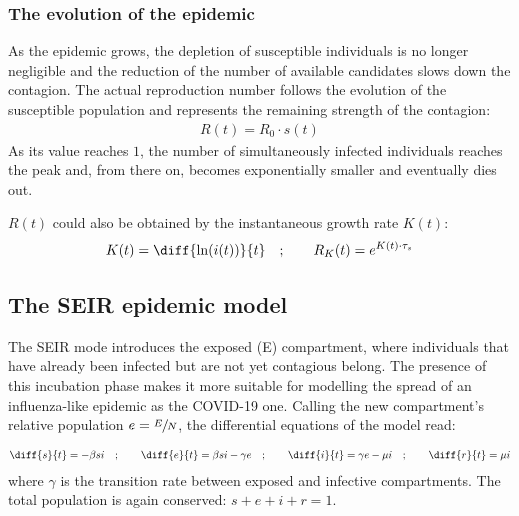 \documentclass[DIV=12, BCOR=0pt]{scrartcl}  %
\begin{document}
  \subsubsection{The evolution of the epidemic}
  
  

  As the epidemic grows, the depletion of susceptible individuals is no longer negligible and the reduction of the number of available candidates slows down the contagion.
  The actual reproduction number follows the evolution of the susceptible population and represents the remaining strength of the contagion:
  \begin{align}
		R(t) = R_0 \cdot s(t) 
		\label{eq:Rt}
  \end{align}
  As its value reaches $1$, the number of simultaneously infected individuals reaches the peak and, from there on, becomes exponentially smaller and eventually dies out.
  
  $R(t)$ could also be obtained by the instantaneous growth rate $K(t)$:
  \begin{align}
  	K(t) =  \diff{\ln(i(t))}{t} \quad ; \qquad  R_{K}(t) = e^{K(t) \cdot \tau_{s}}
  \end{align}

  
  \subsection{The SEIR epidemic model}
  The SEIR mode introduces the exposed (E) compartment, where individuals that have already been infected but are not yet contagious belong. The presence of this incubation phase makes it more suitable for modelling the spread of an influenza-like epidemic as the COVID-19 one. Calling the new compartment's relative population $e = \sfrac{E}{N}$, the differential equations of the model read:
  
  \begin{align}
  	\diff{s}{t} = - \beta s i \quad;  \qquad 	\diff{e}{t} = \beta s i - \gamma e \quad; \qquad \diff{i}{t} = \gamma e - \mu i \quad; \qquad \diff{r}{t} = \mu i
  \end{align}
   where $\gamma$ is the transition rate between exposed and infective compartments. The total population is again conserved: $ s + e + i + r = 1$. 
  
\end{document}
